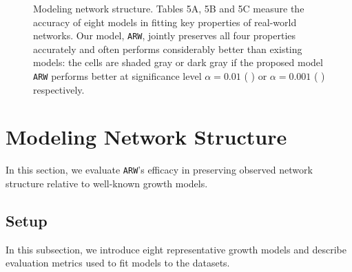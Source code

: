 
\begin{figure*}[t]
	\vspace{-15pt}
	\centering
	\vspace{-16pt}
	\caption{
		Modeling network structure.
		Tables 5A, 5B and 5C
		measure the accuracy of eight models in fitting key properties of real-world networks.
		Our model, \texttt{ARW}, jointly preserves all four properties accurately and often
		performs considerably better than existing models:
		the cells are shaded gray or dark gray if the proposed model \texttt{ARW} performs
		better at significance level $\alpha=0.01$ ( \lightgraybg{ }) or $\alpha=0.001$ ( \darkgraybg{ })
		respectively.
	}
	\vspace{-10pt}
	\label{fig:exp_table}
\end{figure*}

\section{Modeling Network Structure}
\label{sec:Experiments}
In this section, we evaluate \texttt{ARW}'s efficacy in preserving
observed network structure relative to well-known growth models.

\subsection{Setup}
\label{sub:Experimental Setup}

In this subsection, we introduce eight representative growth models
and describe evaluation metrics used to fit models to the datasets.

